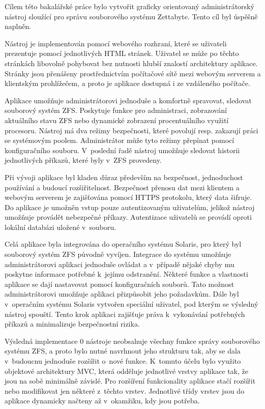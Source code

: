 Cílem této bakalářské práce bylo vytvořit graficky orientovaný administrátorský nástroj sloužící pro správu souborového systému Zettabyte. Tento cíl byl úspěšně naplněn.

Nástroj je implementován pomocí webového rozhraní, které se uživateli prezentuje pomocí jednotlivých HTML stránek. Uživatel se může po těchto stránkách libovolně pohybovat bez nutnosti hlubší znalostí architektury aplikace. Stránky jsou přenášeny prostřednictvím počítačové sítě mezi webovým serverem a klientským prohlížečem, a proto je aplikace dostupná i ze vzdáleného počítače.

Aplikace umožňuje administrátorovi jednoduše a komfortně spravovat, sledovat souborový systém ZFS. Poskytuje funkce pro administraci, zobrazování aktuálního stavu ZFS nebo dynamické zobrazení procentuálního využití procesoru. Nástroj má dva režimy bezpečnosti, které povolují resp. zakazují práci se systémovým poolem. Administrátor může tyto režimy přepínat pomocí konfiguračního souboru. V~poslední řadě nástroj umožňuje sledovat historii jednotlivých příkazů, které byly v~ZFS provedeny.

Při vývoji aplikace byl kladen důraz především na bezpečnost, jednoduchost používání a budoucí rozšiřitelnost. Bezpečnost přenosu dat mezi klientem a webovým serverem je zajišťována pomocí HTTPS protokolu, který data šifruje. Do aplikace je umožněn vstup pouze autentizovaným uživatelům, jelikož nástroj umožňuje provádět nebezpečné příkazy. Autentizace uživatelů se provádí oproti lokální databázi uložené v~souboru.

Celá aplikace byla integrována do operačního systému Solaris, pro který byl souborový systém ZFS původně vyvíjen. Integrace do systému umožňuje administrátorovi aplikaci jednoduše ovládat a v~případě nějaké chyby mu poskytne informace potřebné k~jejímu odstranění. Některé funkce a vlastnosti aplikace se dají nastavovat pomocí konfiguračních souborů. Tato možnost administrátorovi umožňuje aplikaci přizpůsobit jeho požadavkům. Dále byl v~operačním systému Solaris vytvořen speciální uživatel, pod kterým se výsledný nástroj spouští. Tento krok aplikaci zajišťuje práva k~vykonávání potřebných příkazů a minimalizuje bezpečnostní rizika.

Výsledná implementace 0 nástroje neobsahuje všechny funkce správy souborového systému ZFS, a proto bylo nutné navrhnout jeho strukturu tak, aby se dala v~budoucnu jednoduše rozšířit o~nové funkce. K~tomuto účelu bylo využito objektové architektury MVC, která odděluje jednotlivé vrstvy aplikace tak, že jsou na sobě minimálně závislé. Pro rozšíření funkcionality aplikace stačí rozšířit nebo modifikovat jen některé z~těchto vrstev. Jednotlivé třídy vrstev jsou do aplikace dynamicky načteny až v~okamžiku, kdy jsou potřeba.


